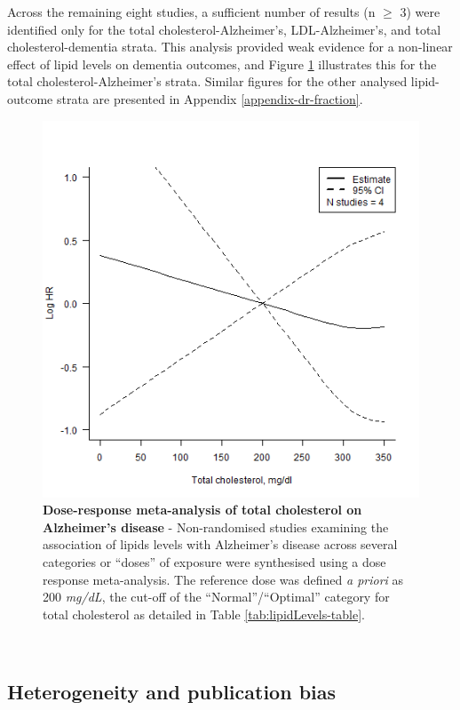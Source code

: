 \documentclass[a4paper, twoside]{templates/ociamthesis}
\begin{document}
Across the remaining eight studies, a sufficient number of results (n \(\geqslant\) 3) were identified only for the total cholesterol-Alzheimer's, LDL-Alzheimer's, and total cholesterol-dementia strata. This analysis provided weak evidence for a non-linear effect of lipid levels on dementia outcomes, and Figure \ref{fig:lipidsDoseResponse} illustrates this for the total cholesterol-Alzheimer's strata. Similar figures for the other analysed lipid-outcome strata are presented in Appendix \ref{appendix-dr-fraction}.





\begin{figure}[H]

{\centering \includegraphics[width=0.7\linewidth]{figures/sys-rev/dr_AD_TC} 

}

\caption[Dose-response meta-analysis of total cholesterol on Alzheimer's disease]{\textbf{Dose-response meta-analysis of total cholesterol on Alzheimer's disease} - Non-randomised studies examining the association of lipids levels with Alzheimer's disease across several categories or ``doses'' of exposure were synthesised using a dose response meta-analysis. The reference dose was defined \emph{a priori} as 200 \emph{mg/dL}, the cut-off of the ``Normal''/``Optimal'' category for total cholesterol as detailed in Table \ref{tab:lipidLevels-table}.}\label{fig:lipidsDoseResponse}
\end{figure}

~

\hypertarget{heterogeneity-and-publication-bias}{%
\subsection{Heterogeneity and publication bias}\label{heterogeneity-and-publication-bias}}
\end{document}
